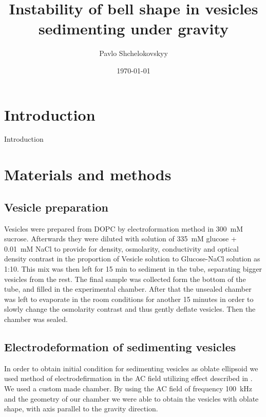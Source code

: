 \documentclass[10pt,a4paper,draft]{article}
\begin{document}
\author{Pavlo Shchelokovskyy}
\title{Instability of bell shape in vesicles sedimenting under gravity}
\date{\today}
\maketitle


\section{Introduction}\label{intro}
Introduction

\section{Materials and methods}\label{methods}
\subsection{Vesicle preparation}
Vesicles were prepared from DOPC by electroformation method \cite{Angelova1986} in 300~mM sucrose.
Afterwards they were diluted with solution of 335~mM glucose + 0.01~mM NaCl to provide for density, osmolarity, conductivity and optical density contrast in the proportion of Vesicle solution to Glucose-NaCl solution as 1:10.
This mix was then left for 15 min to sediment in the tube, separating bigger vesicles from the rest.
The final sample was collected form the bottom of the tube, and filled in the experimental chamber.
After that the unsealed chamber was left to evaporate in the room conditions for another 15 minutes in order to slowly change the osmolarity contrast and thus gently deflate vesicles.
Then the chamber was sealed.

\subsection{Electrodeformation of sedimenting vesicles}
In order to obtain initial condition for sedimenting vesicles as oblate ellipsoid we used method of electrodefirmation in the AC field utilizing effect described in \cite{Aranda2008}.
We used a custom made chamber.
By using the AC field of frequency 100~kHz and the geometry of our chamber we were able to obtain the vesicles with oblate shape, with axis parallel to the gravity direction.
\end{document}
